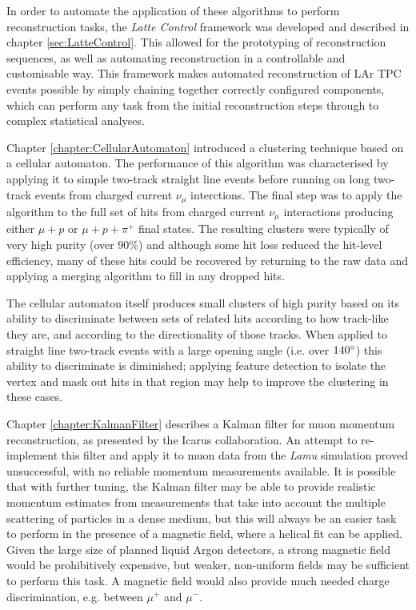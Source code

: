In order to automate the application of these algorithms to perform reconstruction tasks, the \emph{Latte Control} framework was developed and described in chapter \ref{sec:LatteControl}. This allowed for the prototyping of reconstruction sequences, as well as automating reconstruction in a controllable and customisable way. This framework makes automated reconstruction of \ac{LAr TPC} events possible by simply chaining together correctly configured components, which can perform any task from the initial reconstruction steps through to complex statistical analyses.

Chapter \ref{chapter:CellularAutomaton} introduced a clustering technique based on a cellular automaton. The performance of this algorithm was characterised by applying it to simple two-track straight line events before running on long two-track events from charged current $\nu_\mu$ interctions. The final step was to apply the algorithm to the full set of hits from charged current $\nu_\mu$ interactions producing either $\mu + p$ or $\mu + p + \pi^+$ final states. The resulting clusters were typically of very high purity (over $90\%$) and although some hit loss reduced the hit-level efficiency, many of these hits could be recovered by returning to the raw data and applying a merging algorithm to fill in any dropped hits.

The cellular automaton itself produces small clusters of high purity based on its ability to discriminate between sets of related hits according to how track-like they are, and according to the directionality of those tracks. When applied to straight line two-track events with a large opening angle (i.e. over $140^\circ$) this ability to discriminate is diminished; applying feature detection to isolate the vertex and mask out hits in that region may help to improve the clustering in these cases.

Chapter \ref{chapter:KalmanFilter} describes a Kalman filter for muon momentum reconstruction, as presented by the Icarus collaboration. An attempt to re-implement this filter and apply it to muon data from the \emph{Lamu} simulation proved unsuccessful, with no reliable momentum measurements available. It is possible that with further tuning, the Kalman filter may be able to provide realistic momentum estimates from measurements that take into account the multiple scattering of particles in a dense medium, but this will always be an easier task to perform in the presence of a magnetic field, where a helical fit can be applied. Given the large size of planned liquid Argon detectors, a strong magnetic field would be prohibitively expensive, but weaker, non-uniform fields may be sufficient to perform this task. A magnetic field would also provide much needed charge discrimination, e.g. between $\mu^+$ and $\mu^-$.
